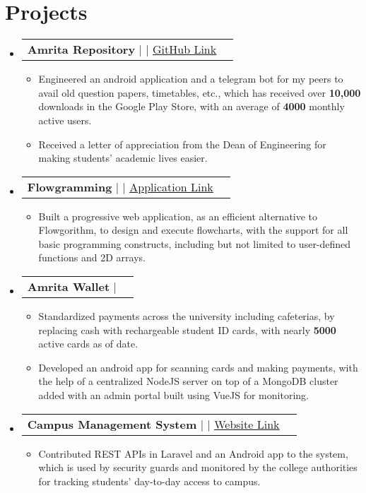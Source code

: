\documentclass[letterpaper,11pt]{article}
\makeatletter
\newcommand{\resumeItem}[1]{
  \item\small{
    {#1 \vspace{-2pt}}
  }
}
\newcommand{\resumeProjectHeading}[2]{
    \item
    \begin{tabular*}{1.001\textwidth}{l@{\extracolsep{\fill}}r}
      \small#1 & \textbf{\small #2}\\
    \end{tabular*}\vspace{-7pt}
}
\newcommand{\resumeSubHeadingListStart}{\begin{itemize}[leftmargin=0.0in, label={}]}
\newcommand{\resumeSubHeadingListEnd}{\end{itemize}}
\newcommand{\resumeItemListStart}{\begin{itemize}}
\newcommand{\resumeItemListEnd}{\end{itemize}\vspace{-5pt}}
\makeatother
\begin{document}
\section{Projects}
    \vspace{-5pt}
    \resumeSubHeadingListStart
      \resumeProjectHeading
          {\textbf{Amrita Repository} $|$ \text{Android, SQLite, Web Scraping, PHP, Python} $|$ \href{https://github.com/rajkumaar23/amrita-repository}{\underline {GitHub Link}}}{}
          \resumeItemListStart
            \resumeItem{Engineered an android application and a telegram bot for my peers to avail old question papers, timetables,  etc., which has received over \textbf{10,000} downloads in the Google Play Store,  with an average of \textbf{4000} monthly active users.}
            \resumeItem{Received a letter of appreciation from the Dean of Engineering for making students' academic lives easier.}
          \resumeItemListEnd
          \vspace{-13pt}
          \resumeProjectHeading
          {\textbf{Flowgramming} $|$ \text{HTML, Bootstrap, jQuery,  JointJS} $|$ \href{https://flowgrammers-org.github.io/flowgramming/}{\underline{Application Link}}}{}
          \resumeItemListStart
            \resumeItem{Built a progressive web application,  as an efficient alternative to Flowgorithm,  to design and execute flowcharts,  with the support for all basic programming constructs,  including but not limited to user-defined functions and 2D arrays.}
          \resumeItemListEnd 
          \vspace{-13pt}
      \resumeProjectHeading
          {\textbf{Amrita Wallet} $|$ \text{Android, NodeJS, MongoDB, VueJS}}{}
          \resumeItemListStart
            \resumeItem{Standardized payments across the university including cafeterias, by replacing cash with rechargeable student ID cards,  with nearly \textbf{5000} active cards as of date.}          
            \resumeItem{Developed an android app for scanning cards and making payments,  with the help of a centralized NodeJS server on top of a MongoDB cluster added with an admin portal built using VueJS for monitoring.}
          \resumeItemListEnd 
          \vspace{-13pt}
          \resumeProjectHeading
          {\textbf{Campus Management System} $|$ \text{PHP, Laravel, MySQL, Android} $|$ \href{https://cms.cb.amrita.edu/humans.txt}{\underline{Website Link}}}{}
          \resumeItemListStart
            \resumeItem{Contributed REST APIs in Laravel and an Android app to the system, which is used by security guards and monitored by the college authorities for tracking students' day-to-day access to campus.}
          \resumeItemListEnd 
    \resumeSubHeadingListEnd
\vspace{-15pt}
\end{document}
